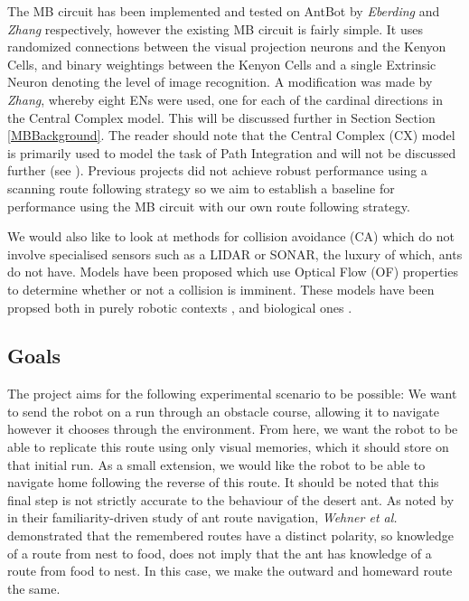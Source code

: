 \documentclass[a4paper,11pt,twoside,openright]{article}
\begin{document}
The MB circuit has been implemented and tested on AntBot by \textit{Eberding} and \textit{Zhang} respectively, however
the existing MB circuit is fairly simple. It uses randomized connections between
the visual projection neurons and the Kenyon Cells, and binary weightings between the Kenyon Cells
and a single Extrinsic Neuron denoting the level of
image recognition. A modification was made by \textit{Zhang}, whereby eight ENs were used, one for each of
the cardinal directions in the Central Complex model. This will be discussed further in Section
Section
\ref{MBBackground}. The reader should note that the Central Complex (CX) model is primarily used
to model the task of Path Integration and will not be discussed further (see \cite{Scimeca2017}).
Previous projects did not achieve robust performance using a scanning route following strategy so we
aim to establish a baseline for performance using the MB circuit with our own route following strategy.
\newline

We would also like to look at methods for collision avoidance (CA) which do not involve specialised
sensors such as a LIDAR or SONAR, the luxury of which, ants do not have. Models have been proposed
which use Optical Flow (OF) properties to determine whether or not a collision is imminent. These
models have been propsed both in purely robotic contexts \cite{Souhila2007},
and biological ones \cite{Low2005}. 
  
\subsection { Goals }

The project aims for the following experimental scenario to be possible: We want to send the robot
on a run through an obstacle course, allowing it to navigate however it chooses through the
environment. From here, we want the robot to be able to replicate this route using only visual
memories, which it should store on that initial run. As a small extension, we would like the robot to be able to 
navigate home following the reverse of this route. It should be noted that this final step is not
strictly accurate to the behaviour of the desert ant. As noted by \cite{Baddeley2012} in their
familiarity-driven study of ant route navigation, \textit{Wehner et al.} \cite{Wehner2006}
demonstrated that the remembered routes have a distinct polarity, so knowledge of a route from
nest to food, does not imply that the ant has knowledge of a route from food to nest. In this case,
we make the outward and homeward route the same.
\newline
\end{document}
